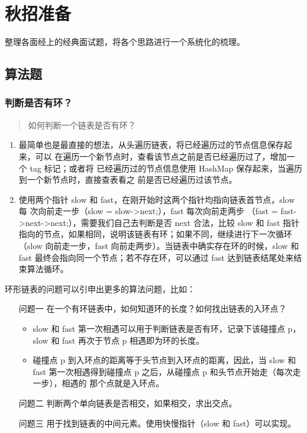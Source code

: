 \chapter{秋招准备}\label{chap:interviews}

\begin{intro}
整理各面经上的经典面试题，将各个思路进行一个系统化的梳理。
\end{intro}

\section{算法题}

\subsection{判断是否有环？}

\begin{quotation}
{\color{red}如何判断一个链表是否有环？}
\end{quotation}

\begin{enumerate}
\item 最简单也是最直接的想法，从头遍历链表，将已经遍历过的节点信息保存起来，可以
  在遍历一个新节点时，查看该节点之前是否已经遍历过了，增加一个 tag 标记；或者将
  已经遍历过的节点信息使用 HashMap 保存起来，当遍历到一个新节点时，直接查表看之
  前是否已经遍历过该节点。
\item 使用两个指针 slow 和 fast，在刚开始时这两个指针均指向链表首节点，slow 每
  次向前走一步（slow = slow->next;），fast 每次向前走两步
  （fast = fast->next->next;），需要我们自己去判断是否 next 合法，比较 slow
  和 fast 指针指向的节点，如果相同，说明该链表有环；如果不同，继续进行下一次循环
  （slow 向前走一步，fast 向前走两步）。当链表中确实存在环的时候，slow 和 fast
  最终会指向同一个节点；若不存在环，可以通过 fast 达到链表结尾处来结束算法循环。
\end{enumerate}

环形链表的问题可以引申出更多的算法问题，比如：

\begin{enumerate}
  \item [问题一] 在一个有环链表中，如何知道环的长度？如何找出链表的入环点？
  \begin{itemize}
  \item slow 和 fast 第一次相遇可以用于判断链表是否有环，记录下该碰撞点 p，
    slow 和 fast 再次于节点 p 相遇即为环的长度。
  \item 碰撞点 p 到入环点的距离等于头节点到入环点的距离，因此，当 slow 和 fast
    第一次相遇得到碰撞点 p 之后，从碰撞点 p 和头节点开始走（每次走一步），相遇的
    那个点就是入环点。
  \end{itemize}
  \item [问题二] 判断两个单向链表是否相交，如果相交，求出交点。
  \item [问题三] 用于找到链表的中间元素。使用快慢指针（slow 和 fast）可以实现。
\end{enumerate}


